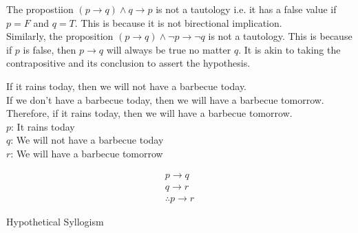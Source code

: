 \documentclass[a4paper, 12pt]{article}
\newenvironment{example}[1][Example]{\begin{trivlist}
\item[\hskip \labelsep {\bfseries #1}]}{\end{trivlist}}
\newenvironment{remark}[1][Remark]{\begin{trivlist}
\item[\hskip \labelsep {\bfseries #1}]}{\end{trivlist}}
\newcommand{\then}{\rightarrow}
\begin{document}
    \begin{remark}
        The propostiion $(p \then q) \wedge q \then p$ is not a tautology i.e. it has a false
        value if $p = F$ and $q = T$. This is because it is not birectional implication. \\
        Similarly, the proposition $(p \then q) \wedge \neg p \then \neg q$ is not a tautology.
        This is because if $p$ is false, then $p \then q$ will always be true no matter $q$.
        It is akin to taking the contrapositive and its conclusion to assert the hypothesis.
    \end{remark}
    \begin{example}
        If it rains today, then we will not have a barbecue today. \\
        If we don't have a barbecue today, then we will have a barbecue tomorrow. \\
        Therefore, if it rains today, then we will have a barbecue tomorrow. \\
        $p$: It rains today \\
        $q$: We will not have a barbecue today \\
        $r$: We will have a barbecue tomorrow \\
        \begin{center}
            \parbox{3cm}{\begin{gather*}
                p \then q \\
                q \then r \\
                \hline
                \therefore p \then r
            \end{gather*}}
            \quad Hypothetical Syllogism
        \end{center}
    \end{example}
\end{document}
